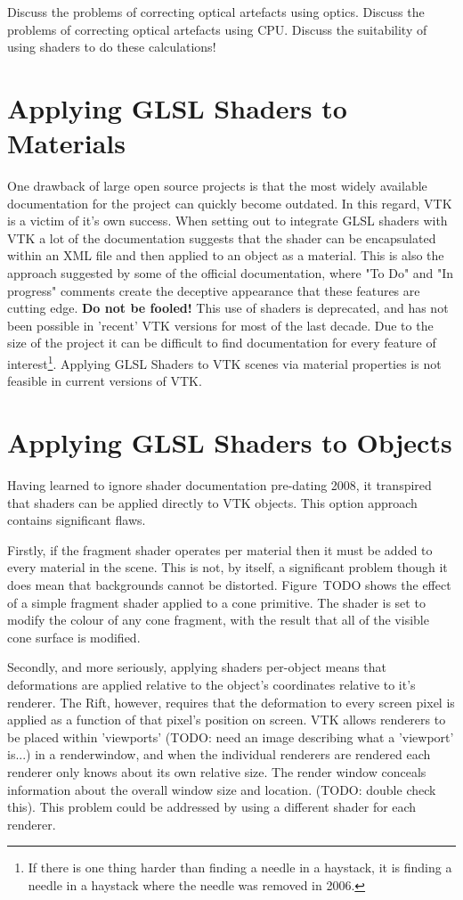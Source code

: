 \documentclass[MSc,paper=a4,pagesize=auto]{icldt}
\begin{document}
Discuss the problems of correcting optical artefacts using optics.
Discuss the problems of correcting optical artefacts using CPU. 
Discuss the suitability of using shaders to do these calculations!

\section{Applying GLSL Shaders to Materials}
One drawback of large open source projects is that the most widely available documentation for the project can quickly become outdated. In this regard, VTK is a victim of it's own success. When setting out to integrate GLSL shaders with VTK a lot of the documentation suggests that the shader can be encapsulated within an XML file and then applied to an object as a material. This is also the approach suggested by some of the official documentation, where "To Do" and "In progress" comments create the deceptive appearance that these features are cutting edge. \textbf{Do not be fooled!} This use of shaders is deprecated, and has not been possible in 'recent' VTK versions for most of the last decade. Due to the size of the project it can be difficult to find documentation for every feature of interest\footnote{If there is one thing harder than finding a needle in a haystack, it is finding a needle in a haystack where the needle was removed in 2006.}. 
Applying GLSL Shaders to VTK scenes via material properties is not feasible in current versions of VTK.


\section{Applying GLSL Shaders to Objects}
Having learned to ignore shader documentation pre-dating 2008, it transpired that shaders can be applied directly to VTK objects. This option approach contains  significant flaws. 

Firstly, if the fragment shader operates per material then it must be added to every material in the scene. This is not, by itself, a significant problem though it does mean that backgrounds cannot be distorted. Figure~TODO shows the effect of a simple fragment shader applied to a cone primitive. The shader is set to modify the colour of any cone fragment, with the result that all of the visible cone surface is modified.

Secondly, and more seriously, applying shaders per-object means that deformations are applied relative to the object's coordinates relative to it's renderer. The Rift, however, requires that the deformation to every screen pixel is applied as a function of that pixel's position on screen. VTK allows renderers to be placed within 'viewports' (TODO: need an image describing what a 'viewport' is...) in a renderwindow, and when the individual renderers are rendered each renderer only knows about its own relative size. The render window conceals information about the overall window size and location. (TODO: double check this). This problem could be addressed by using a different shader for each renderer.
\end{document}
